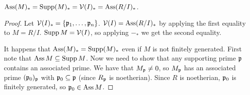  \begin{theorem}
   $\operatorname{Ass} (M)_* = \operatorname{Supp} (M)_* = \mathcal{V}(I)_* = \operatorname{Ass} (R/I)_*$.
 \end{theorem}
 \begin{proof}
   Let $\mathcal{V}(I)_*= \{\mathfrak{p}_1,\dots, \mathfrak{p}_n\}$. $\mathcal{V}(I)=\operatorname{Ass}(R/I)_*$ by applying the first
   equality to $M=R/I$. $\operatorname{Supp} M=\mathcal{V}(I)$, so applying $-_*$ we get the second equality.

   It happens that $\operatorname{Ass} (M)_* = \operatorname{Supp} (M)_*$ even if $M$ is not finitely generated.
   First note that $\operatorname{Ass} M \subseteq \operatorname{Supp} M$. Now we need to show that any supporting
   prime $\mathfrak{p}$ contains an associated prime. We have that $M_{\mathfrak{p}}\neq 0$, so $M_{\mathfrak{p}}$ has an
   associated prime $(\mathfrak{p}_0)_{\mathfrak{p}}$ with $\mathfrak{p}_0\subseteq \mathfrak{p}$ (since $R_{\mathfrak{p}}$ is noetherian).
   Since $R$ is noetherian, $\mathfrak{p}_0$ is finitely generated, so $\mathfrak{p}_0\in \operatorname{Ass} M$.
 \end{proof}
